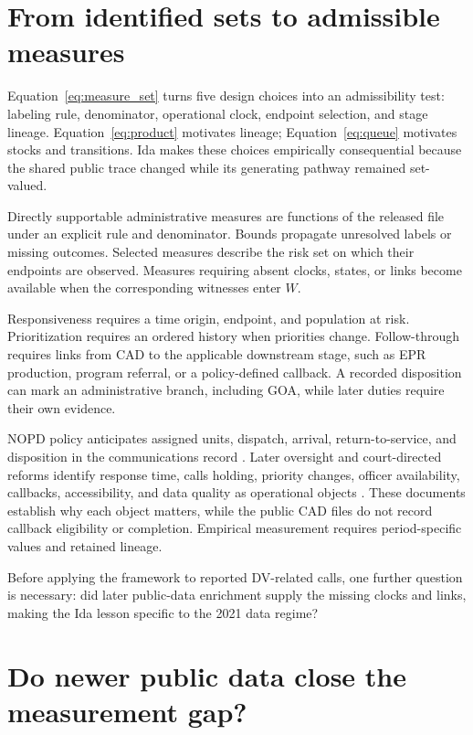 \documentclass[11pt]{article}
\begin{document}
\section{From identified sets to admissible measures}

Equation~\ref{eq:measure_set} turns five design choices into an admissibility test: labeling rule, denominator, operational clock, endpoint selection, and stage lineage. Equation~\ref{eq:product} motivates lineage; Equation~\ref{eq:queue} motivates stocks and transitions. Ida makes these choices empirically consequential because the shared public trace changed while its generating pathway remained set-valued.

Directly supportable administrative measures are functions of the released file under an explicit rule and denominator. Bounds propagate unresolved labels or missing outcomes. Selected measures describe the risk set on which their endpoints are observed. Measures requiring absent clocks, states, or links become available when the corresponding witnesses enter $W$.

Responsiveness requires a time origin, endpoint, and population at risk. Prioritization requires an ordered history when priorities change. Follow-through requires links from CAD to the applicable downstream stage, such as EPR production, program referral, or a policy-defined callback. A recorded disposition can mark an administrative branch, including GOA, while later duties require their own evidence.

NOPD policy anticipates assigned units, dispatch, arrival, return-to-service, and disposition in the communications record \citep{NOPDManual}. Later oversight and court-directed reforms identify response time, calls holding, priority changes, officer availability, callbacks, accessibility, and data quality as operational objects \citep{SustainmentPlan2024,CourtOrder2025,OIPM2022,OIPM2026}. These documents establish why each object matters, while the public CAD files do not record callback eligibility or completion. Empirical measurement requires period-specific values and retained lineage.

Before applying the framework to reported DV-related calls, one further question is necessary: did later public-data enrichment supply the missing clocks and links, making the Ida lesson specific to the 2021 data regime?

\section{Do newer public data close the measurement gap?}
\end{document}
